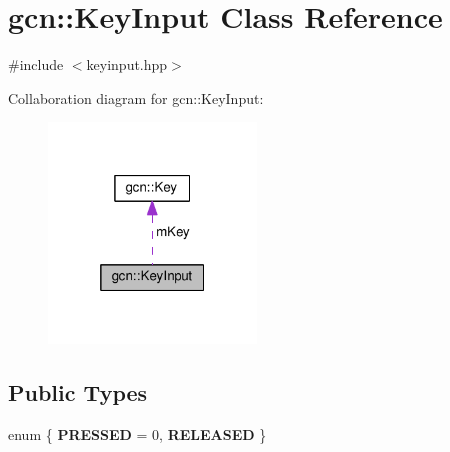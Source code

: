 \hypertarget{classgcn_1_1KeyInput}{}\section{gcn\+:\+:Key\+Input Class Reference}
\label{classgcn_1_1KeyInput}


{\ttfamily \#include $<$keyinput.\+hpp$>$}



Collaboration diagram for gcn\+:\+:Key\+Input\+:\nopagebreak
\begin{figure}[H]
\begin{center}
\leavevmode
\includegraphics[width=157pt]{classgcn_1_1KeyInput__coll__graph}
\end{center}
\end{figure}
\subsection*{Public Types}
\begin{DoxyCompactItemize}
\item 
enum \{ {\bfseries P\+R\+E\+S\+S\+ED} = 0, 
{\bfseries R\+E\+L\+E\+A\+S\+ED}
 \}
\end{DoxyCompactItemize}
